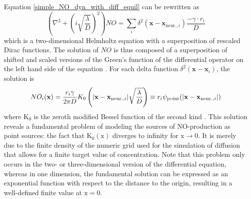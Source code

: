 \documentclass[10pt,a4paper]{article}
\begin{document}
Equation \eqref{simple_NO_dyn_with_diff_equil} can be rewritten as
\begin{equation}
\left( \nabla^2 + \left( i\sqrt{\frac{\lambda}{D}}\right)^2\right) NO = \sum_{i} \delta^2(\mathbf{x}-\mathbf{x}_{\mathrm{ neur.},i}) \frac{- \gamma \cdot r_i}{D}
\label{simple_NO_dyn_with_diff_equil_helmholtz}
\end{equation}
which is a two-dimensional Helmholtz equation with a superposition of rescaled Dirac functions. The solution of $NO$ is thus composed of a superposition of shifted and scaled versions of the Green's function of the differential operator on the left hand side of the equation \cite{EncyMath}. For each delta function $\delta^2(\mathbf{x}-\mathbf{x}_i)$, the solution is
\begin{equation}
NO_i(\mathbf{x}) = \frac{r_i \gamma}{2 \pi D} K_0 \left(|\mathbf{x}-\mathbf{x}_{\mathrm{ neur.},i}|\sqrt{\frac{\lambda}{D}} \right) \equiv r_i \psi_{\rm point}(|\mathbf{x}-\mathbf{x}_{\mathrm{ neur.},i}|)
\label{solution_diff_equil_bessel}
\end{equation}
where $\mathrm{K_0}$ is the zeroth modified Bessel function of the second kind \cite{Helmholtz_Solution_2d}. This solution reveals a fundamental problem of modeling the sources of NO-production as point sources: the fact that $\mathrm{K_0(x)}$ diverges to infinity for $\mathrm{x\rightarrow 0}$. It is merely due to the finite density of the numeric grid used for the simulation of diffusion that allows for a finite target value of concentration. Note that this problem only occurs in the two- or three-dimensional version of the differential equation, whereas in one dimension, the fundamental solution can be expressed as an exponential function with respect to the distance to the origin, resulting in a well-defined finite value at $\mathrm{x=0}$.
\end{document}
